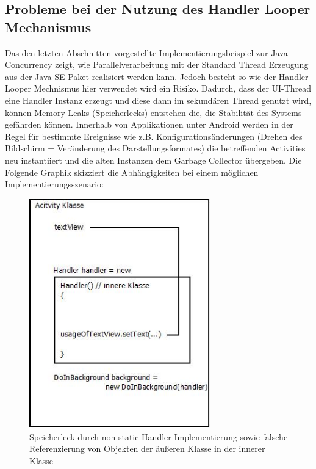 \documentclass[12pt,oneside,a4paper,bibtotoc,liststotoc]{scrreprt}
\begin{document}
\subsection{Probleme bei der Nutzung des Handler Looper Mechanismus}
Das den letzten Abschnitten vorgestellte Implementierungsbeispiel zur Java Concurrency zeigt, wie Parallelverarbeitung mit der Standard Thread Erzeugung aus der Java SE Paket realisiert werden kann. Jedoch besteht so wie der Handler Looper Mechnismus hier verwendet wird ein Risiko. Dadurch, dass der UI-Thread eine Handler Instanz erzeugt und diese dann im sekundären Thread genutzt wird, können Memory Leaks (Speicherlecks) entstehen die, die Stabilität des Systems gefährden können. Innerhalb von Applikationen unter Android werden in der Regel für bestimmte Ereignisse wie z.B. Konfigurationsänderungen (Drehen des Bildschirm = Veränderung des Darstellungsformates) die betreffenden Activities neu instantiiert und die alten Instanzen dem Garbage Collector übergeben. Die Folgende Graphik skizziert die Abhängigkeiten bei einem möglichen Implementierungsszenario:
\begin{figure}[H]
  \begin{centering}
    \includegraphics[width=0.7\textwidth]{img/weakReference.jpeg}
    \caption{Speicherleck durch non-static Handler Implementierung sowie falsche Referenzierung von Objekten der äußeren Klasse in der innerer Klasse}
    \label{weakReference}
  \end{centering}
\end{figure}
\end{document}
